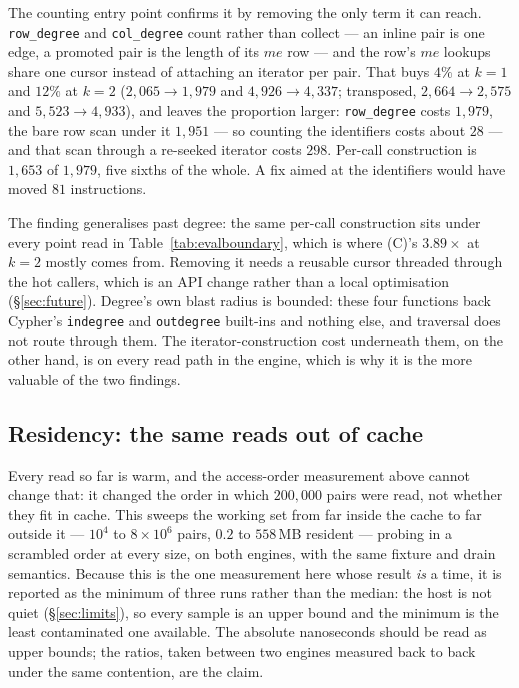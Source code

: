 \documentclass[11pt,a4paper]{article}
\theoremstyle{plain}
\theoremstyle{definition}
\theoremstyle{remark}
\begin{document}
The counting entry point confirms it by removing the only term it can reach.
\texttt{row\_degree} and \texttt{col\_degree} count rather than collect --- an
inline pair is one edge, a promoted pair is the length of its $me$ row --- and
the row's $me$ lookups share one cursor instead of attaching an iterator per
pair. That buys $4\%$ at $k=1$ and $12\%$ at $k=2$ ($2{,}065 \to 1{,}979$ and
$4{,}926 \to 4{,}337$; transposed, $2{,}664 \to 2{,}575$ and
$5{,}523 \to 4{,}933$), and leaves the proportion larger: \texttt{row\_degree}
costs $1{,}979$, the bare row scan under it $1{,}951$ --- so counting the
identifiers costs about $28$ --- and that scan through a re-seeked iterator
costs $298$. Per-call construction is $1{,}653$ of $1{,}979$, five sixths of
the whole. A fix aimed at the identifiers would have moved $81$ instructions.

The finding generalises past degree: the same per-call construction sits under
every point read in Table~\ref{tab:evalboundary}, which is where (C)'s
$3.89\times$ at $k=2$ mostly comes from. Removing it needs a reusable cursor
threaded through the hot callers, which is an API change rather than a local
optimisation (\S\ref{sec:future}). Degree's own blast radius is bounded: these
four functions back Cypher's \texttt{indegree} and \texttt{outdegree} built-ins
and nothing else, and traversal does not route through them. The
iterator-construction cost underneath them, on the other hand, is on every read
path in the engine, which is why it is the more valuable of the two findings.

\subsection{Residency: the same reads out of cache}
\label{sec:evalcold}

Every read so far is warm, and the access-order measurement above cannot
change that: it changed the order
in which $200{,}000$ pairs were read, not whether they fit in cache. This sweeps
the working set from far inside the cache to far outside it --- $10^4$ to
$8 \times 10^6$ pairs, $0.2$ to $558$\,MB resident --- probing in a scrambled
order at every size, on both engines, with the same fixture and drain semantics.
Because this is the one measurement here whose result \emph{is} a time, it is
reported as the minimum of three runs rather than the median: the host is not
quiet (\S\ref{sec:limits}), so every sample is an upper bound and the minimum is
the least contaminated one available. The absolute nanoseconds should be read as
upper bounds; the ratios, taken between two engines measured back to back under
the same contention, are the claim.
\end{document}
